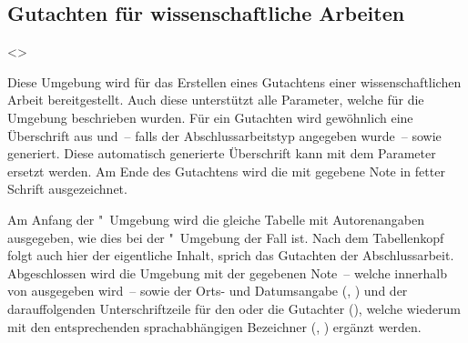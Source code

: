 \begin{DeclareEntity}{}
\section{%
  Gutachten für wissenschaftliche Arbeiten%
}
%
\begin{Declaration}
  {}
  <>
\begin{Declaration}
  {}
\begin{Declaration}
  {}
\printdeclarationlist
%
Diese Umgebung wird für das Erstellen eines Gutachtens einer wissenschaftlichen 
Arbeit bereitgestellt. Auch diese unterstützt alle Parameter, welche für die 
Umgebung  beschrieben wurden. Für ein Gutachten wird 
gewöhnlich eine Überschrift aus  und~-- falls der 
Abschlussarbeitstyp angegeben wurde~--  sowie 
 generiert. Diese automatisch generierte Überschrift kann mit dem 
Parameter  ersetzt werden. Am Ende des 
Gutachtens wird die mit  gegebene Note in fetter 
Schrift ausgezeichnet.

Am Anfang der "~Umgebung wird die gleiche Tabelle mit 
Autorenangaben ausgegeben, wie dies bei der "~Umgebung der 
Fall ist. Nach dem Tabellenkopf folgt auch hier der eigentliche Inhalt, sprich 
das Gutachten der Abschlussarbeit. Abgeschlossen wird die Umgebung mit der 
gegebenen Note~-- welche innerhalb von  ausgegeben wird~-- 
sowie der Orts- und Datumsangabe (, ) und der 
darauffolgenden Unterschriftzeile für den oder die Gutachter (), 
welche wiederum mit den entsprechenden sprachabhängigen Bezeichner 
(, ) ergänzt werden.
\end{Declaration}
\end{Declaration}
\end{Declaration}


\end{DeclareEntity}
